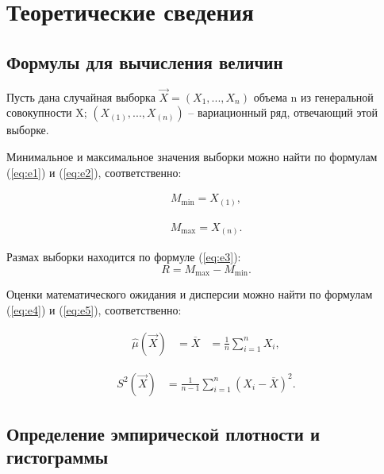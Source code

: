 \chapter{Теоретические сведения}

\section{Формулы для вычисления величин}

Пусть дана случайная выборка $\vec X = (X_1, ..., X_n)$ объема n из генеральной совокупности X;  $(X_{(1)}, ..., X_{(n)})$ -- вариационный ряд, отвечающий этой выборке.

Минимальное и максимальное значения выборки можно найти по формулам (\ref {eq:e1}) и (\ref {eq:e2}), соответственно:

\begin{equation}
    \begin{aligned}
        M_{\min} = X_{(1)},
    \end{aligned}
	\label{eq:e1}
\end{equation}

\begin{equation}
	\begin{aligned}
		M_{\max} = X_{(n)}.
	\end{aligned}
	\label{eq:e2}
\end{equation}

Размах выборки находится по формуле (\ref {eq:e3}):
\begin{equation}
    R = M_{\max} - M_{\min}.
    \label{eq:e3}
\end{equation}


Оценки математического ожидания и дисперсии можно найти по формулам (\ref {eq:e4}) и (\ref {eq:e5}), соответственно:

\begin{equation}
	\begin{aligned}
		\hat\mu(\vec X) &= \overline X &= \frac 1n \sum_{i=1}^n X_i,
	\end{aligned}
	\label{eq:e4}
\end{equation}

\begin{equation}
	\begin{aligned}
		S^2(\vec X) &= \frac 1{n-1} \sum_{i=1}^n (X_i-\overline X)^2.
	\end{aligned}
	\label{eq:e5}
\end{equation}


\section{Определение эмпирической плотности и гистограммы}

